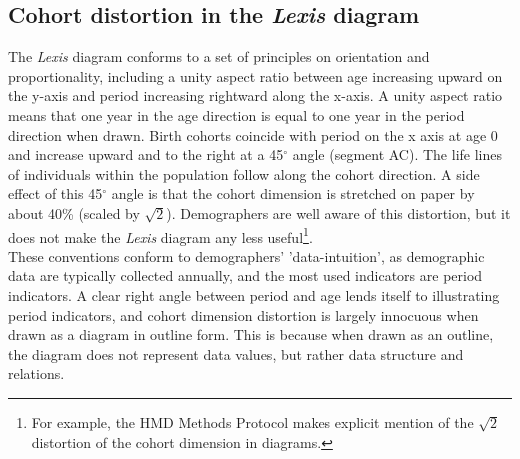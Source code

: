 \documentclass[a4paper]{article}
\begin{document}
\subsection*{Cohort distortion in the \textit{Lexis} diagram}
The \textit{Lexis} diagram conforms to a set of principles on orientation and proportionality, including a unity aspect ratio between age increasing upward on the y-axis and period increasing rightward along the x-axis. A unity aspect ratio means that one year in the age direction is equal to one year in the period direction when drawn. Birth cohorts coincide with period on the x axis at age 0 and increase upward and to the right at a 45$^\circ$ angle (segment AC). The life lines of individuals within the population follow along the cohort direction. A side effect of this 45$^\circ$ angle is that the cohort dimension is stretched on paper by about 40\% (scaled by $\sqrt{2}$). Demographers are well aware of this distortion, but it does not make the \textit{Lexis} diagram any less useful\footnote{For example, the HMD Methods Protocol  makes explicit mention of the $\sqrt{2}$ distortion of the cohort dimension in diagrams.}.\\ 

These conventions conform to demographers' 'data-intuition', as demographic data are typically collected annually, and the most used indicators are period indicators. A clear right angle between period and age lends itself to illustrating period indicators, and cohort dimension distortion is largely innocuous when drawn as a diagram in outline form. This is because when drawn as an outline, the diagram does not represent data values, but rather data structure and relations.
\end{document}
